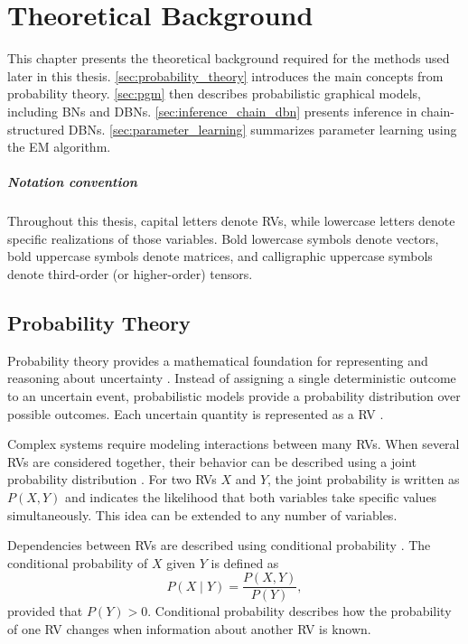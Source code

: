 \chapter{Theoretical Background}
\label{chap:theoretical_background}
This chapter presents the theoretical background required for the methods used later in this thesis.
\autoref{sec:probability_theory} introduces the main concepts from probability theory.
\autoref{sec:pgm} then describes probabilistic graphical models, including \acp{BN} and \acp{DBN}.
\autoref{sec:inference_chain_dbn} presents inference in chain-structured \acp{DBN}.
\autoref{sec:parameter_learning} summarizes parameter learning using the \ac{EM} algorithm.

\paragraph{Notation convention}
\label{par:notation_convention}
Throughout this thesis, capital letters denote \acp{RV}, while lowercase letters denote specific realizations of those variables.
Bold lowercase symbols denote vectors, bold uppercase symbols denote matrices, and calligraphic uppercase symbols denote third-order (or higher-order) tensors.


\section{Probability Theory}
\label{sec:probability_theory}
Probability theory provides a mathematical foundation for representing and reasoning about uncertainty \cite{pml1Book}. 
Instead of assigning a single deterministic outcome to an uncertain event, probabilistic models provide a probability distribution over possible outcomes.  
Each uncertain quantity is represented as a \ac{RV} \cite{pml1Book}. 


\par Complex systems require modeling interactions between many \acp{RV}. When several \acp{RV} are considered together, their behavior can be described using a 
joint probability distribution \cite{pml1Book}. 
 For two \acp{RV} $X$ and $Y$, the joint probability is written as $P(X,Y)$ and indicates the likelihood that both 
 variables take specific values simultaneously.  
 This idea can be extended to any number of variables. 

 \par Dependencies between \acp{RV} are described using conditional probability \cite{pml1Book}. 
 The conditional probability of $X$ given $Y$ is defined as 
\[
P(X \mid Y) = \frac{P(X,Y)}{P(Y)},
\]
provided that $P(Y) > 0$. 
Conditional probability describes how the probability of one \ac{RV} changes when information about another \ac{RV} is known. 


